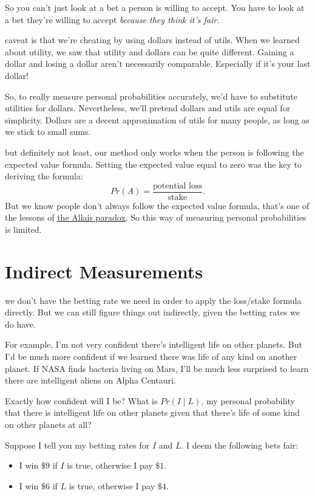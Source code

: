 \documentclass[justified]{tufte-book}
\providecommand{\tightlist}{%
  \setlength{\itemsep}{0pt}\setlength{\parskip}{0pt}}
\newcommand{\given}{\mid}
\newcommand{\p}{Pr}
\theoremstyle{definition}
\theoremstyle{definition}
\theoremstyle{definition}
\theoremstyle{remark}
\begin{document}
So you can't just look at a bet a person is willing to accept. You have
to look at a bet they're willing to accept \emph{because they think it's
fair}.

 caveat is that we're cheating by using dollars
instead of utils. When we learned about utility, we saw that utility and
dollars can be quite different. Gaining a dollar and losing a dollar
aren't necessarily comparable. Especially if it's your last dollar!

So, to really measure personal probabilities accurately, we'd have to
substitute utilities for dollars. Nevertheless, we'll pretend dollars
and utils are equal for simplicity. Dollars are a decent approximation
of utils for many people, as long as we stick to small sums.

 but definitely not least, our method only works when
the person is following the expected value formula. Setting the expected
value equal to zero was the key to deriving the formula:
\[ \p(A) = \frac{\mbox{potential loss}}{\mbox{stake}}. \] But we know
people don't always follow the expected value formula, that's one of the
lessons of \protect\hyperlink{the-allais-paradox}{the Allais paradox}.
So this way of measuring personal probabilities is limited.

\hypertarget{indirect-measurements}{%
\section{Indirect Measurements}\label{indirect-measurements}}

 we don't have the betting rate we need in order
to apply the loss/stake formula directly. But we can still figure things
out indirectly, given the betting rates we do have.

For example, I'm not very confident there's intelligent life on other
planets. But I'd be much more confident if we learned there was life of
any kind on another planet. If NASA finds bacteria living on Mars, I'll
be much less surprised to learn there are intelligent aliens on Alpha
Centauri.

Exactly how confident will I be? What is \(\p(I \given L)\), my personal
probability that there is intelligent life on other planets given that
there's life of some kind on other planets at all?

Suppose I tell you my betting rates for \(I\) and \(L\). I deem the
following bets fair:

\begin{itemize}
\tightlist
\item
  I win \(\$9\) if \(I\) is true, otherwise I pay \(\$1\).
\item
  I win \(\$6\) if \(L\) is true, otherwise I pay \(\$4\).
\end{itemize}
\end{document}
